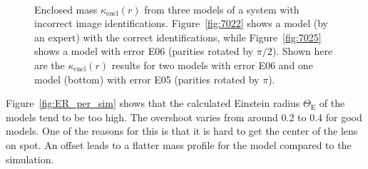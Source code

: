 \documentclass[12pt,preprint]{aastex}
\newcommand{\ERf}[1][]{Einstein radius $\Theta_\text{E#1}$\xspace} %
\newcommand{\kenc}[1][r]{$\kappa_\text{encl}(#1)$\xspace}
\newcommand{\figref}[1]{Figure~\ref{fig:#1}}
\newcommand{\Figref}[1]{Figure~\ref{fig:#1}}
\begin{document}
\begin{figure}
  \centering
   \\
  \caption{Enclosed mass \kenc from three models of a system with incorrect image identifications. \figref{7022} shows a model (by an expert) with the correct identifications, while \figref{7025} shows a model with error E06 (parities rotated by $\pi/2$).  Shown here are the \kenc results for two models with error E06 and one model (bottom) with error E05 (parities rotated by $\pi$).}
\label{fig:kapenc_compare_faulty}
\end{figure}

\Figref{ER_per_sim} shows that the calculated \ERf of the models tend to be too high.
The overshoot varies from around 0.2 to 0.4 for good models.
One of the reasons for this is that it is hard to get the center of the lens on spot.
An offset leads to a flatter mass profile for the model compared to the simulation.
\end{document}
